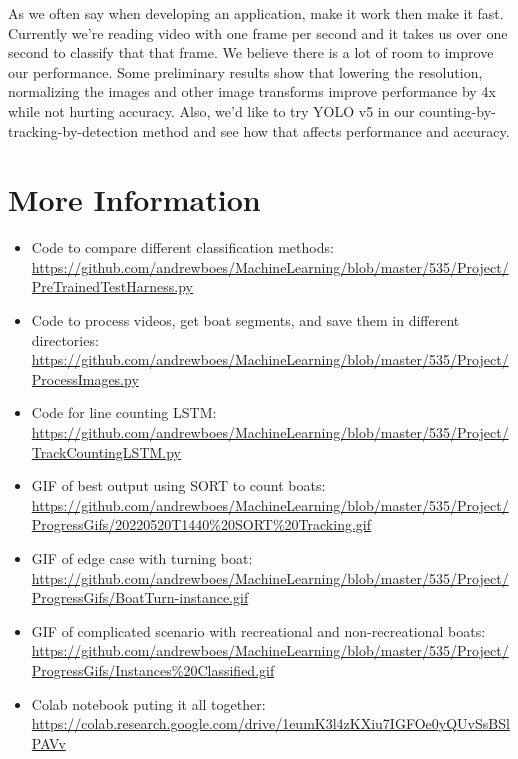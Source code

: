 \documentclass[10pt,twocolumn,letterpaper]{article}
\begin{document}
As we often say when developing an application, make it work then make it fast. Currently we're reading video with one frame per second and it takes us over one second to classify that that frame. We believe there is a lot of room to improve our performance. Some preliminary results show that lowering the resolution, normalizing the images and other image transforms improve performance by 4x while not hurting accuracy. Also, we'd like to try YOLO v5 in our counting-by-tracking-by-detection method and see how that affects performance and accuracy.

\section{More Information}

\begin{itemize}
    \renewcommand\labelitemi{--}
    \item Code to compare different classification methods: \url{https://github.com/andrewboes/MachineLearning/blob/master/535/Project/PreTrainedTestHarness.py}
    \item Code to process videos, get boat segments, and save them in different directories: \url{https://github.com/andrewboes/MachineLearning/blob/master/535/Project/ProcessImages.py}
    \item Code for line counting LSTM: \url{https://github.com/andrewboes/MachineLearning/blob/master/535/Project/TrackCountingLSTM.py} 
    \item GIF of best output using SORT to count boats: \url{https://github.com/andrewboes/MachineLearning/blob/master/535/Project/ProgressGifs/20220520T1440\%20SORT\%20Tracking.gif}
    \item GIF of edge case with turning boat: \url{https://github.com/andrewboes/MachineLearning/blob/master/535/Project/ProgressGifs/BoatTurn-instance.gif}
    \item GIF of complicated scenario with recreational and non-recreational boats: \url{https://github.com/andrewboes/MachineLearning/blob/master/535/Project/ProgressGifs/Instances\%20Classified.gif}
    \item Colab notebook puting it all together: \url{https://colab.research.google.com/drive/1eumK3l4zKXiu7IGFOe0yQUvSsBSlPAVv}
\end{itemize}
\end{document}
